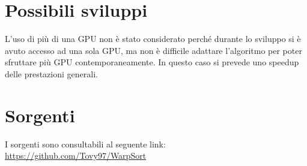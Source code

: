 \documentclass[a4paper, 11pt]{article}
\begin{document}
	\section{Possibili sviluppi}
		L'uso di più di una GPU non è stato considerato perché durante lo sviluppo si è avuto accesso ad una sola GPU, ma non è difficile
		adattare l'algoritmo per poter sfruttare più GPU contemporaneamente. 
		In questo caso si prevede uno speedup delle prestazioni generali.
	\section{Sorgenti}
		\label{sorgenti}
		I sorgenti sono consultabili al seguente link: \url{https://github.com/Tovy97/WarpSort}
			
	\printbibliography		
\end{document}
